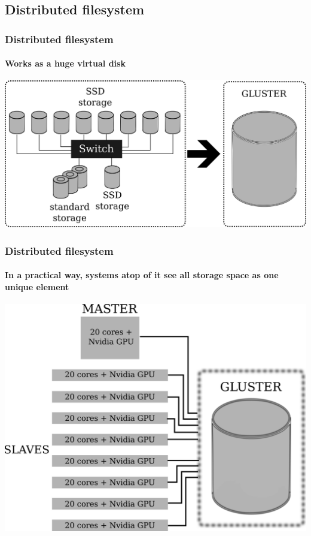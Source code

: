 \documentclass[svgnames,smaller,table]{beamer}
\begin{document}
\subsection{Distributed filesystem}

\begin{frame}
  \frametitle{Distributed filesystem}
  \framesubtitle{Works as a \textbf{huge} virtual disk}
    \begin{center}
      \includegraphics[scale=0.65]{images/gluster.png}
    \end{center}
\end{frame}

\begin{frame}
  \frametitle{Distributed filesystem}
  \framesubtitle{In a practical way, systems atop of it see all storage space as one unique element}
    \begin{center}
      \includegraphics[scale=0.45]{images/cluster-gluster.png}
        \end{center}
\end{frame}
\end{document}
